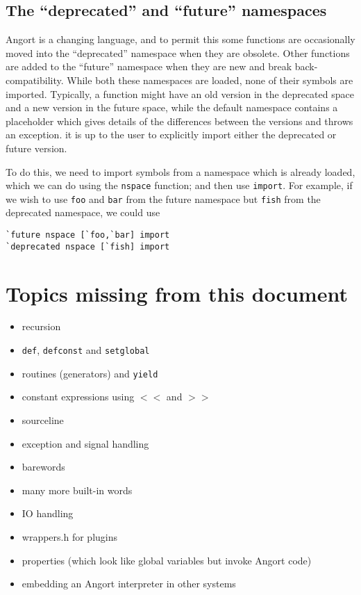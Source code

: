\subsection{The ``deprecated'' and ``future'' namespaces}
\label{futdep}
Angort is a changing language, and to permit this some functions are
occasionally moved into the ``deprecated'' namespace when they are obsolete.
Other functions are added to the ``future'' namespace when they are new
and break back-compatibility. 
While both these namespaces are loaded, none of their symbols are imported. 
Typically, a function might have an
old version in the deprecated space and a new version in the future space,
while the default namespace contains a placeholder which gives details
of the differences between the versions and throws an exception.
it is up to the user to explicitly import either the deprecated or
future version.

To do this, we need to import symbols from a namespace which is already
loaded, which we can do using the \texttt{nspace} function; and then
use \texttt{import}. For example, if we wish to use \texttt{foo} and
\texttt{bar} from the future namespace but \texttt{fish} from the deprecated
namespace, we could use
\begin{lstlisting}
`future nspace [`foo,`bar] import
`deprecated nspace [`fish] import
\end{lstlisting}


\section{Topics missing from this document}
\begin{itemize}
\item recursion
\item \texttt{def}, \texttt{defconst} and \texttt{setglobal} 
\item routines (generators) and \texttt{yield}
\item constant expressions using $<<$ and $>>$
\item sourceline
\item exception and signal handling
\item barewords
\item many more built-in words
\item IO handling
\item wrappers.h for plugins
\item properties (which look like global variables but invoke Angort code)
\item embedding an Angort interpreter in other systems
\end{itemize}




